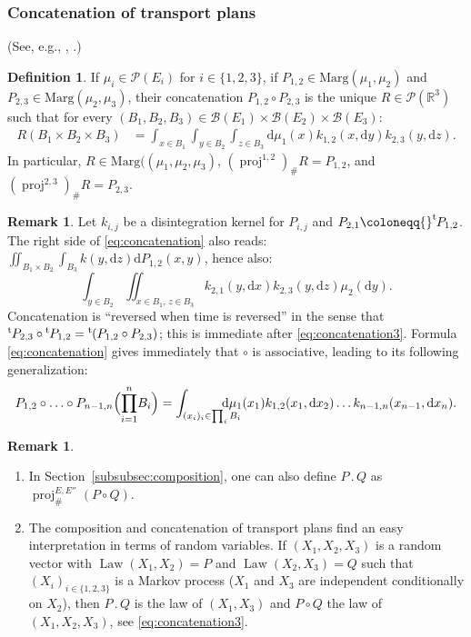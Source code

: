 \documentclass[JEP,XML,SOM,Unicode,NoEqCountersInSection,NoFloatCountersInSection,published]{cedram}
\newcommand{\ldot}{\mathbin{.}}
\theoremstyle{plain}
\theoremstyle{definition}
\newtheorem{defi}[them]{Definition}
\newtheorem{rem}[them]{Remark}
\newcommand{\dd}{\mathrm{d}}
\newcommand{\trans}{{}^{\mathrm{t}}\mkern-1mu}
\newcommand{\eqdefup}{\coloneqq}
\newcommand{\p}{\mathcal{P}}
\newcommand{\ma}{\mathrm{Marg}}
\newcommand{\R}{\mathbb{R}}
\newcommand{\law}{\operatorname{Law}}
\newcommand{\pr}{\operatorname{proj}}
\begin{document}
\subsubsection{Concatenation of transport plans}\label{subsec:caten} (See, e.g., \cite[p.\,111]{Ke72}, \cite[p.\,23]{Vi2}.)
\begin{defi}\label{defi:concatenation}
If $\mu_i\in\p(E_i)$ for $i\in\{1,2,3\}$, if $P_{1,2}\in\ma(\mu_1,\mu_2)$ and $P_{2,3}\in\ma(\mu_2,\mu_3)$, their concatenation $P_{1,2}\circ P_{2,3}$ is the unique $R\in\p(\R^3)$ such that for every $ (B_1,B_2,B_3)\in\mathcal{B}(E_1)\times\mathcal{B}(E_2)\times\mathcal{B}(E_3)$:
\begin{align}\label{eq:concatenation}
R(B_1\times B_2\times B_3)&=\int_{x\in B_1}\int_{y\in B_2}\int_{z\in B_3} \dd\mu_1(x)k_{1,2}(x,\dd y)k_{2,3}(y,\dd z).
\end{align}
In particular, $R\in\ma((\mu_1,\mu_2,\mu_3)$, $(\pr^{1,2})_\#R=P_{1,2}$, and $(\pr^{2,3})_\#R=P_{2,3}$.
\end{defi}

\begin{rem} Let $k_{i,j}$ be a disintegration kernel for $P_{i,j}$ and $P_{2,1}\eqdefup\trans P_{1,2}$. The right side of \eqref{eq:concatenation} also reads: $\iint_{B_1\times B_2} \int_{B_3}k(y,\dd z)\dd P_{1,2}(x,y)$, hence also:
\begin{equation}
\int_{y\in B_2} \iint_{x\in B_1,\,z\in B_3}k_{2,1}(y,\dd x)k_{2,3}(y,\dd z)\mu_2(\dd y).\label{eq:concatenation3}
\end{equation}
Concatenation is ``reversed when time is reversed'' in the sense that $\trans P_{2,3}\circ{}\trans P_{1,2}=\trans(P_{1,2}\circ P_{2,3})$; this is immediate after \eqref{eq:concatenation3}. Formula \eqref{eq:concatenation} gives immediately that $\circ$ is associative, leading to its following generalization:
\[P_{1,2}\circ\ldots\circ P_{n-1,n}\Bigl({\prod_{i=1}^n}B_i\Bigr)=\int_{(x_i)_i\in \prod_iB_i}
\hspace{-4ex}\dd\mu_1(x_1)k_{1,2}(x_1,\dd x_2)\ldots k_{n-1,n}(x_{n-1},\dd x_n).\]
\end{rem}

\skpt
\begin{rem}
\begin{enumerate}
\item
In Section~\ref{subsubsec:composition}, one can also define $P\ldot Q$ as $\pr^{E,E''}_\#(P\circ Q)$.

\item
The composition and concatenation of transport plans find an easy interpretation in terms of random variables. If $(X_1,X_2,X_3)$ is a random vector with $\law(X_1,X_2)=P$ and $\law(X_2,X_3)=Q$ such that $(X_i)_{i\in\{1,2,3\}}$ is a Markov process ($X_1$ and $X_3$ are independent conditionally on $X_2$), then $P\ldot Q$ is the law of $(X_1,X_3)$ and $P\circ Q$ the law of $(X_1,X_2,X_3)$, see \eqref{eq:concatenation3}.
\end{enumerate}
\end{rem}
\end{document}
